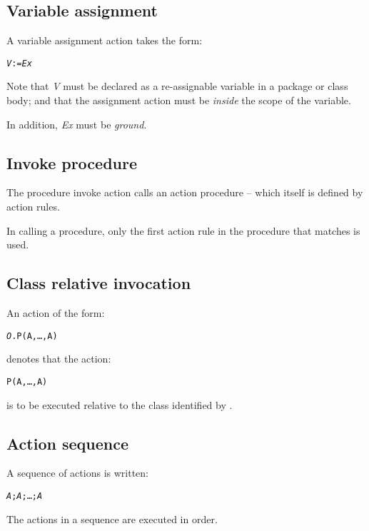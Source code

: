\subsection{Variable assignment}
\label{action:assignment}

A variable assignment action takes the form:
\begin{alltt}
\emph{V} := \emph{Ex}
\end{alltt}
Note that \emph{V} must be declared as a re-assignable variable in a package or class body; and that the assignment action must be \emph{inside} the scope of the variable.

In addition, \emph{Ex} must be \emph{ground}. 

\subsection{Invoke procedure}
\label{action:invoke}

The procedure invoke action calls an action procedure -- which itself is defined by action rules. 

In calling a procedure, only the first action rule in the procedure that matches is used.

\subsection{Class relative invocation}
\label{action:dot}
An action of the form:
\begin{alltt}
\emph{O}.P(A,\ldots,A\subn)
\end{alltt}
denotes that the action:
\begin{alltt}
P(A,\ldots,A\subn)\end{alltt}
is to be executed relative to the class identified by .

\subsection{Action sequence}
\label{action:sequence}

A sequence of actions is written:
\begin{alltt}
\emph{A};\emph{A};\ldots;\emph{A\subn}
\end{alltt}
The actions  in a sequence are executed in order.

